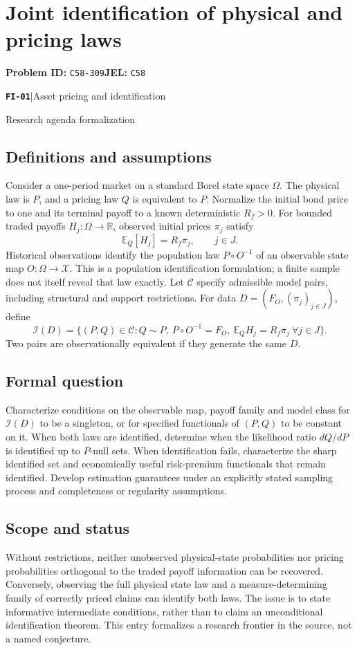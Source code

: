 \documentclass[11pt,a4paper]{article}
\newcommand{\R}{\mathbb R}
\newcommand{\E}{\mathbb E}
\newcommand{\entrymeta}[3]{{\sffamily\small\color{muted}\textbf{\texttt{#1}}\quad|\quad #2\par #3\par}}
\begin{document}
\section*{Joint identification of physical and pricing laws}
\textbf{Problem ID:} \texttt{C58-309}\quad \textbf{JEL:} \texttt{C58}\par
\label{problem:OP-0578}
\label{beyond:FI-01}
\entrymeta{FI-01}{Asset pricing and identification}{Research agenda formalization}
\subsection*{Definitions and assumptions}
Consider a one-period market on a standard Borel state space $\Omega$. The physical law is $P$, and a pricing law $Q$ is equivalent to $P$. Normalize the initial bond price to one and its terminal payoff to a known deterministic $R_f>0$. For bounded traded payoffs $H_j:\Omega\to\R$, observed initial prices $\pi_j$ satisfy
\[
 \E_Q[H_j]=R_f\pi_j,\qquad j\in J.
\]
Historical observations identify the population law $P\circ O^{-1}$ of an observable state map $O:\Omega\to\mathcal X$. This is a population identification formulation; a finite sample does not itself reveal that law exactly. Let $\mathcal C$ specify admissible model pairs, including structural and support restrictions. For data $D=(F_O,(\pi_j)_{j\in J})$, define
\[
 \mathcal I(D)=\{(P,Q)\in\mathcal C:Q\sim P,\ P\circ O^{-1}=F_O,
 \ \E_QH_j=R_f\pi_j\ \forall j\in J\}.
\]
Two pairs are observationally equivalent if they generate the same $D$.
\subsection*{Formal question}
Characterize conditions on the observable map, payoff family and model class for $\mathcal I(D)$ to be a singleton, or for specified functionals of $(P,Q)$ to be constant on it. When both laws are identified, determine when the likelihood ratio $dQ/dP$ is identified up to $P$-null sets. When identification fails, characterize the sharp identified set and economically useful risk-premium functionals that remain identified. Develop estimation guarantees under an explicitly stated sampling process and completeness or regularity assumptions.
\subsection*{Scope and status}
Without restrictions, neither unobserved physical-state probabilities nor pricing probabilities orthogonal to the traded payoff information can be recovered. Conversely, observing the full physical state law and a measure-determining family of correctly priced claims can identify both laws. The issue is to state informative intermediate conditions, rather than to claim an unconditional identification theorem. This entry formalizes a research frontier in the source, not a named conjecture.
\end{document}
